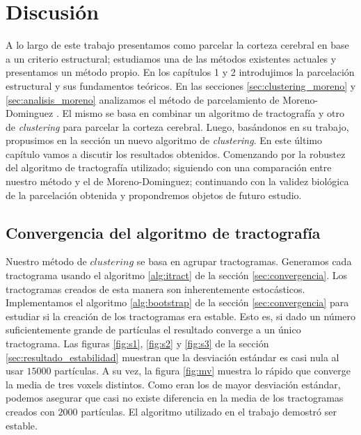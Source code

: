 \chapter{Discusi\'on} 
\label{ch:discusion}

A lo largo de este trabajo presentamos como parcelar la corteza cerebral
en base a un criterio estructural; estudiamos una de las m\'etodos
existentes actuales y presentamos un m\'etodo propio. En los cap\'itulos
1 y 2 introdujimos la parcelaci\'on estructural y sus fundamentos 
te\'oricos. En las secciones \ref{sec:clustering_moreno} y 
\ref{sec:analisis_moreno} analizamos el m\'etodo de parcelamiento de
Moreno-Dominguez \cite{Moreno-Dominguez2014}. El mismo
se basa en combinar un algoritmo de tractograf\'ia y otro de 
\textit{clustering} para parcelar la corteza cerebral. Luego, bas\'andonos
en su trabajo, propusimos en la secci\'on \label{ch:nuestro} un nuevo
algoritmo de \textit{clustering}. En este \'ultimo cap\'itulo vamos a discutir los resultados obtenidos. Comenzando por la robustez del
algoritmo de tractograf\'ia utilizado; siguiendo con una comparaci\'on
entre nuestro m\'etodo y el de Moreno-Dominguez; continuando con la
validez biol\'ogica de la parcelaci\'on obtenida y propondremos objetos de
futuro estudio. \\

\section{Convergencia del algoritmo de tractograf\'ia}

Nuestro m\'etodo de $clustering$ se basa en agrupar tractogramas. 
Generamos cada tractograma usando el algoritmo \ref{alg:itract} de la 
secci\'on \ref{sec:convergencia}. Los tractogramas creados de esta manera
son inherentemente estoc\'asticos. Implementamos el algoritmo 
\ref{alg:bootstrap} de la secci\'on \ref{sec:convergencia} para estudiar
si la creaci\'on de los tractogramas era estable. Esto es, si dado un 
n\'umero suficientemente grande de part\'iculas el resultado converge
a un \'unico tractograma. Las figuras \ref{fig:s1}, \ref{fig:s2} y 
\ref{fig:s3} de la secci\'on \ref{sec:resultado_estabilidad} muestran que
la desviaci\'on est\'andar es casi nula al usar $15000$ part\'iculas. A su
vez, la figura \ref{fig:mv} muestra lo r\'apido que converge la media de
tres voxels distintos. 
Como eran los de mayor desviaci\'on est\'andar, podemos asegurar que casi
no existe diferencia en la media de los tractogramas creados con $2000$
part\'iculas. El algoritmo utilizado en el trabajo demostr\'o ser estable.
\\

